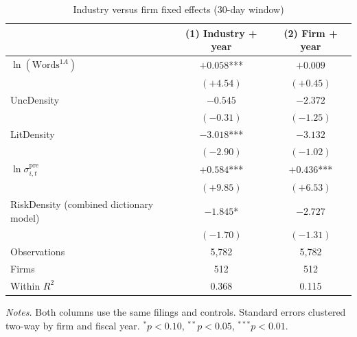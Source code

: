 \begin{table}[htbp]
\centering
\caption{Industry versus firm fixed effects (30-day window)}
\label{tab:firm_fe}
\small
\begin{tabular}{lcc}
\toprule
 & (1) Industry + year & (2) Firm + year \\
\midrule
$\ln(\text{Words}^{1A})$ & $+0.058$*** & $+0.009$ \\
 & $(+4.54)$ & $(+0.45)$ \\[2pt]
UncDensity & $-0.545$ & $-2.372$ \\
 & $(-0.31)$ & $(-1.25)$ \\[2pt]
LitDensity & $-3.018$*** & $-3.132$ \\
 & $(-2.90)$ & $(-1.02)$ \\[2pt]
$\ln\sigma^{\mathrm{pre}}_{i,t}$ & $+0.584$*** & $+0.436$*** \\
 & $(+9.85)$ & $(+6.53)$ \\[2pt]
\midrule
RiskDensity (combined dictionary model) & $-1.845$* & $-2.727$ \\
 & $(-1.70)$ & $(-1.31)$ \\
\midrule
Observations & 5,782 & 5,782 \\
Firms & 512 & 512 \\
Within $R^2$ & 0.368 & 0.115 \\
\bottomrule
\end{tabular}
\par\smallskip
\begin{minipage}{\linewidth}\footnotesize
\emph{Notes.} Both columns use the same filings and controls. Standard errors clustered two-way by firm and fiscal year. $^{*}p<0.10$, $^{**}p<0.05$, $^{***}p<0.01$.
\end{minipage}
\end{table}
